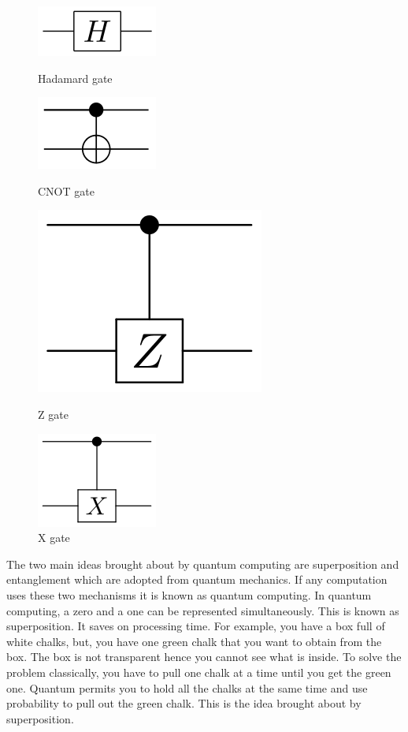 \begin{figure}[!h]
\center
\begin{minipage}[b]{0.3\textwidth}
\includegraphics[scale=0.75]{images/hadamardgate.png} 
\caption{Hadamard gate}
\label{fig: Hadamard}
 \end{minipage}   
\hfill
\begin{minipage}[b]{0.5\textwidth}
\includegraphics[scale=0.75]{images/cnotgate.png}  
\caption{CNOT gate}
\label{fig: CNOT}
\end{minipage}
\center
\begin{minipage}[b]{0.3\textwidth}
\includegraphics[scale=0.45]{images/zgate.png} 
\caption{Z gate}
\label{fig: Z}
 \end{minipage}   
\hfill
\begin{minipage}[b]{0.5\textwidth}
\includegraphics[scale=0.75]{images/Xgate.png} 
\caption{X gate}
\label{fig: X}
\end{minipage}
\end{figure}

The two main ideas brought about by quantum computing are superposition and entanglement which are adopted from quantum mechanics. If any computation uses these two mechanisms it is known as quantum computing. In quantum computing, a zero and a one can be represented simultaneously. This is known as superposition. It saves on processing time. For example, you have a box full of white chalks, but, you have one green chalk that you want to obtain from the box. The box is not transparent hence you cannot see what is inside. To solve the problem classically, you have to pull one chalk at a time until you get the green one. Quantum permits you to hold all the chalks at the same time and use probability to pull out the green chalk. This is the idea brought about by superposition.

